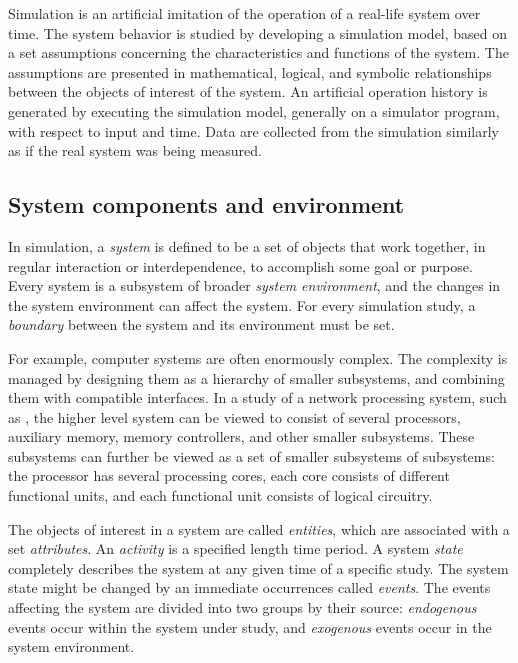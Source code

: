 Simulation is an artificial imitation of the operation of a real-life system over time. The system behavior is studied by developing a simulation model, based on a set assumptions concerning the characteristics and functions of the system. The assumptions are presented in mathematical, logical, and symbolic relationships between the objects of interest of the system. An artificial operation history is generated by executing the simulation model, generally on a simulator program, with respect to input and time. Data are collected from the simulation similarly as if the real system was being measured.

\subsection{System components and environment}
\label{sec:syst-comp-envir}

In simulation, a \emph{system} is defined to be a set of objects that work together, in regular interaction or interdependence, to accomplish some goal or purpose. Every system is a subsystem of broader \emph{system environment}, and the changes in the system environment can affect the system. For every simulation study, a \emph{boundary} between the system and its environment must be set. \cite{Banks:2010:DES}

For example, computer systems are often enormously complex. The complexity is managed by designing them as a hierarchy of smaller subsystems, and combining them with compatible interfaces. In a study of a network processing system, such as \cite{cavium OCTEON}, the higher level system can be viewed to consist of several processors, auxiliary memory, memory controllers, and other smaller subsystems. These subsystems can further be viewed as a set of smaller subsystems of subsystems: the processor has several processing cores, each core consists of different functional units, and each functional unit consists of logical circuitry. \cite{Banks:2010:DES}

The objects of interest in a system are called \emph{entities}, which are associated with a set \emph{attributes}. An \emph{activity} is a specified length time period. A system \emph{state} completely describes the system at any given time of a specific study. The system state might be changed by an immediate occurrences called \emph{events}. The events affecting the system are divided into two groups by their source: \emph{endogenous} events occur within the system under study, and \emph{exogenous} events occur in the system environment. \cite{Banks:2010:DES}

